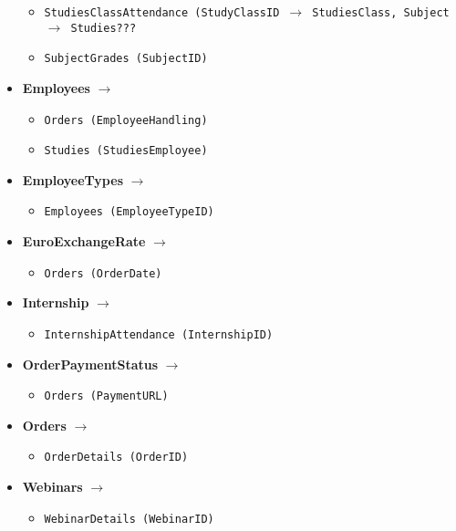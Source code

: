 \documentclass[12pt]{article}
\begin{document}
\begin{itemize}
\begin{itemize}
            \item \texttt{StudiesClassAttendance (StudyClassID \(\rightarrow\) StudiesClass, Subject \(\rightarrow\) Studies???}
            \item \texttt{SubjectGrades (SubjectID)}
        \end{itemize}
\newpage
    \item \textbf{Employees} \(\rightarrow\)
        \begin{itemize}
            \item \texttt{Orders (EmployeeHandling)}
            \item \texttt{Studies (StudiesEmployee)}
        \end{itemize}
    \item \textbf{EmployeeTypes} \(\rightarrow\)
        \begin{itemize}
            \item \texttt{Employees (EmployeeTypeID)}
        \end{itemize}
    \item \textbf{EuroExchangeRate} \(\rightarrow\)
        \begin{itemize}
            \item \texttt{Orders (OrderDate)}
        \end{itemize}
    \item \textbf{Internship} \(\rightarrow\)
        \begin{itemize}
            \item \texttt{InternshipAttendance (InternshipID)}
        \end{itemize}
    \item \textbf{OrderPaymentStatus} \(\rightarrow\)
        \begin{itemize}
            \item \texttt{Orders (PaymentURL)}
        \end{itemize}
    \item \textbf{Orders} \(\rightarrow\)
        \begin{itemize}
            \item \texttt{OrderDetails (OrderID)}
        \end{itemize}
    \item \textbf{Webinars} \(\rightarrow\)
        \begin{itemize}
            \item \texttt{WebinarDetails (WebinarID)}
        \end{itemize}
\end{itemize}
\end{document}
